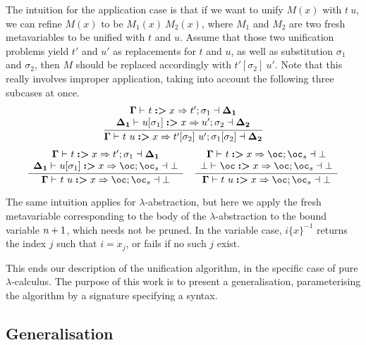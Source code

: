 The intuition for the application case is that if we want to unify
$M(x)$ with $t\ u$, we can refine $M(x)$ to be $M_{1}(x)\ M_{2}(x)$,
where $M_{1}$ and $M_{2}$ are two fresh metavariables to be unified
with $t$ and $u$. Assume that those two unification problems yield
$t'$ and $u'$ as replacements for $t$ and $u$, as well as substitution
$\sigma_{1}$ and $\sigma_{2}$, then $M$ should be replaced accordingly
with $t'[\sigma_{2}]\ u'$. Note that this really involves improper
application, taking into account the following three subcases at once.
\[
\dfrac{\begin{array}{c}
\dotmcontext{\Gamma}\prune tx{\sigma_{1}}{t'}\dashv\dotmcontext{\Delta_{1}}\\
\dotmcontext{\Delta_{1}}\prune{u[\sigma_{1}]}x{\sigma_{2}}{u'}\dashv\dotmcontext{\Delta_{2}}
\end{array}}{\dotmcontext{\Gamma}\prune{t\ u}x{\sigma_{1}[\sigma_{2}]}{t'[\sigma_{2}]\ u'}\dashv\dotmcontext{\Delta_{2}}}
\]
\[
\dfrac{\begin{array}{c}
\dotmcontext{\Gamma}\prune tx{\sigma_{1}}{t'}\dashv\dotmcontext{\Delta_{1}}\\
\dotmcontext{\Delta_{1}}\prune{u[\sigma_{1}]}x{\bang_{s}}{\bang}\dashv\bot
\end{array}}{\dotmcontext{\Gamma}\prune{t\ u}x{\bang_{s}}{\bang}\dashv\bot}\quad\dfrac{\begin{array}{c}
\dotmcontext{\Gamma}\prune tx{\bang_{s}}{\bang}\dashv\bot\\
\bot\prune{\bang}x{\bang_{s}}{\bang}\dashv\bot
\end{array}}{\dotmcontext{\Gamma}\prune{t\ u}x{\bang_{s}}{\bang}\dashv\bot}
\]

The same intuition applies for $\lambda$-abstraction, but here we
apply the fresh metavariable corresponding to the body of the $\lambda$-abstraction
to the bound variable $n+1$, which needs not be pruned. In
the variable case, $i\{x\}^{-1}$ returns the index $j$ such that
$i=x_{j}$, or fails if no such $j$ exist.

This ends our description of the unification algorithm, in the specific
case of pure $\lambda$-calculus. The purpose of this work is to present
a generalisation, parameterising the algorithm by a signature specifying
a syntax.


\subsection{Generalisation}

